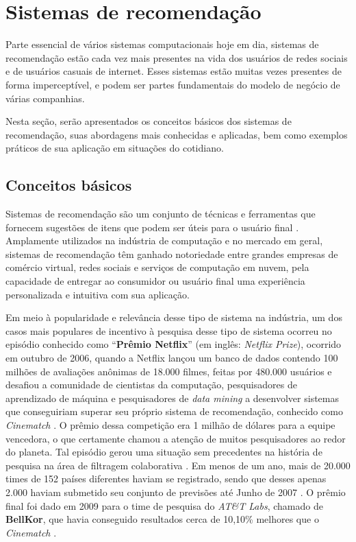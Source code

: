 \documentclass[
	12pt,				%
	oneside,			%
	a4paper,			%
	chapter=TITLE,		%
	english,			%
	french,				%
	spanish,			%
	brazil				%
	]{abntex2}
\begin{document}
\section{Sistemas de recomendação}\label{sec_recom}

Parte essencial de vários sistemas computacionais hoje em dia, sistemas de recomendação estão cada vez mais presentes na vida dos usuários de redes sociais e de usuários casuais de internet. Esses sistemas estão muitas vezes presentes de forma imperceptível, e podem ser partes fundamentais do modelo de negócio de várias companhias.

Nesta seção, serão apresentados os conceitos básicos dos sistemas de recomendação, suas abordagens mais conhecidas e aplicadas, bem como exemplos práticos de sua aplicação em situações do cotidiano.

\subsection{Conceitos básicos}

Sistemas de recomendação são um conjunto de técnicas e ferramentas que fornecem sugestões de itens que podem ser úteis para o usuário final \cite{resnick1997recommender, good1999combining, burke2007hybrid}. Amplamente utilizados na indústria de computação e no mercado em geral, sistemas de recomendação têm ganhado notoriedade entre grandes empresas de comércio virtual, redes sociais e serviços de computação em nuvem, pela capacidade de entregar ao consumidor ou usuário final uma experiência personalizada e intuitiva com sua aplicação.

Em meio à popularidade e relevância desse tipo de sistema na indústria, um dos casos mais populares de incentivo à pesquisa desse tipo de sistema ocorreu no episódio conhecido como ``\textbf{Prêmio Netflix}'' (em inglês: \emph{Netflix Prize}), ocorrido em outubro de 2006, quando a Netflix \cite{netflix} lançou um banco de dados contendo 100 milhões de avaliações anônimas de 18.000 filmes, feitas por 480.000 usuários e desafiou a comunidade de cientistas da computação, pesquisadores de aprendizado de máquina e pesquisadores de \emph{data mining} a desenvolver sistemas que conseguiriam superar seu próprio sistema de recomendação, conhecido como \emph{Cinematch} \cite{bennett2007netflix}. O prêmio dessa competição era 1 milhão de dólares para a equipe vencedora, o que certamente chamou a atenção de muitos pesquisadores ao redor do planeta. Tal episódio gerou uma situação sem precedentes na história de pesquisa na área de filtragem colaborativa \cite{bell2007lessons}. Em menos de um ano, mais de 20.000 times de 152 países diferentes haviam se registrado, sendo que desses apenas 2.000 haviam submetido seu conjunto de previsões até Junho de 2007 \cite{bennett2007netflix}. O prêmio final foi dado em 2009 para o time de pesquisa do \emph{AT\&T Labs}, chamado de \textbf{BellKor}, que havia conseguido resultados cerca de 10,10\% melhores que o \emph{Cinematch} \cite{koren2009bellkor}.
\end{document}
